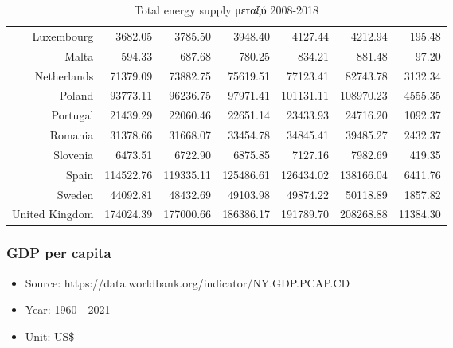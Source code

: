 \documentclass[a4paper,twoside,10pt]{article}
\begin{document}
\begin{table}[H]
\begin{tabular}{|r|rrrrr|r|}
  \hline
Luxembourg & 3682.05 & 3785.50 & 3948.40 & 4127.44 & 4212.94 & 195.48 \\ 
Malta & 594.33 & 687.68 & 780.25 & 834.21 & 881.48 & 97.20 \\ 
Netherlands & 71379.09 & 73882.75 & 75619.51 & 77123.41 & 82743.78 & 3132.34 \\ 
Poland & 93773.11 & 96236.75 & 97971.41 & 101131.11 & 108970.23 & 4555.35 \\ 
Portugal & 21439.29 & 22060.46 & 22651.14 & 23433.93 & 24716.20 & 1092.37 \\
  \hline 
Romania & 31378.66 & 31668.07 & 33454.78 & 34845.41 & 39485.27 & 2432.37 \\ 
Slovenia & 6473.51 & 6722.90 & 6875.85 & 7127.16 & 7982.69 & 419.35 \\ 
Spain & 114522.76 & 119335.11 & 125486.61 & 126434.02 & 138166.04 & 6411.76 \\ 
Sweden & 44092.81 & 48432.69 & 49103.98 & 49874.22 & 50118.89 & 1857.82 \\ 
United Kingdom & 174024.39 & 177000.66 & 186386.17 & 191789.70 & 208268.88 & 11384.30 \\ 
\hline
	\end{tabular}
	\caption{Total energy supply μεταξύ 2008-2018}
	\label{Total energy Supply}
\end{table}

\subsubsection{GDP per capita}
	\begin{itemize}
	\item Source: https://data.worldbank.org/indicator/NY.GDP.PCAP.CD
	\item Year: 1960 - 2021
	\item Unit: US\$
\end{itemize}
\end{document}
